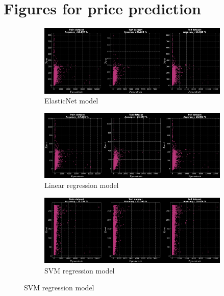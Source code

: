 \section{Figures for price prediction}
\begin{figure}[h]
	\begin{center}
		\begin{subfigure}{\textwidth}
			\centering
			\includegraphics[width=0.9\linewidth]{./images/fig_15_ealstic_price.png}
			\caption{ElasticNet model}
		\end{subfigure}
		\begin{subfigure}{\textwidth}
			\centering
			\includegraphics[width=0.9\linewidth]{./images/fig_16_linear_price.png}
			\caption{Linear regression model}
		\end{subfigure}
		\begin{subfigure}{\textwidth}
			\centering
			\includegraphics[width=0.9\linewidth]{./images/fig_17_svm.png} 
			\caption{SVM regression model}
		\end{subfigure}
	\end{center}
\end{figure}